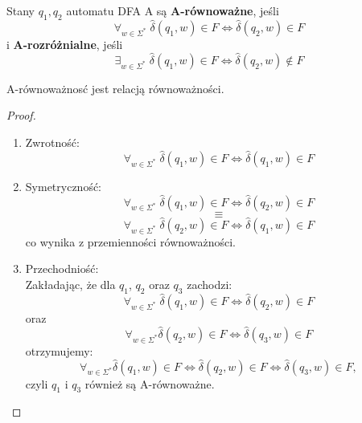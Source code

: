 \begin{definition}
    Stany \( q_1, q_2 \) automatu DFA A są \textbf{A-równoważne}, jeśli
    \[
        \forall_{w \in \Sigma^*}\; \hat \delta(q_1, w) \in F \iff \hat \delta(q_2, w) \in F
    \]
    i \textbf{A-rozróżnialne}, jeśli
    \[
        \exists_{w \in \Sigma^*}\; \hat \delta(q_1, w) \in F \iff \hat \delta(q_2, w) \notin F
    \]
\end{definition}

\begin{lemma}
    A-równoważnosć jest relacją równoważności.
\end{lemma}
\begin{proof}
    \begin{enumerate}
        \item Zwrotność: 
            \[
                \forall_{w \in \Sigma^*}\; \hat \delta(q_1, w) \in F \iff \hat \delta(q_1, w) \in F
            \]
        \item Symetryczność:
            \[ 
                \forall_{w \in \Sigma^*}\; \hat \delta(q_1, w) \in F \iff \hat \delta(q_2, w) \in F
            \]
            \[
                \equiv 
            \]
            \[
                \forall_{w \in \Sigma^*}\; \hat \delta(q_2, w) \in F \iff \hat \delta(q_1, w) \in F
            \]
            co wynika z przemienności równoważności.
        \item Przechodniość: \\
        Zakładając, że dla \(q_1\), \(q_2\) oraz \(q_3\) zachodzi:
        \[ 
             \forall_{w \in \Sigma^*}\; \hat \delta(q_1, w) \in F \iff \hat \delta(q_2, w) \in F
        \]
        oraz
        \[ 
             \forall_{w \in \Sigma^*} \hat \delta(q_2, w) \in F \iff \hat \delta(q_3, w) \in F
        \]
        otrzymujemy:
        \[ 
            \forall_{w \in \Sigma^*} \hat \delta(q_1, w) \in F \iff \hat \delta(q_2, w) \in F \iff \hat \delta(q_3, w) \in F,
        \]
        czyli \(q_1\) i \(q_3\) również są A-równoważne. 
    \end{enumerate}
\end{proof}
